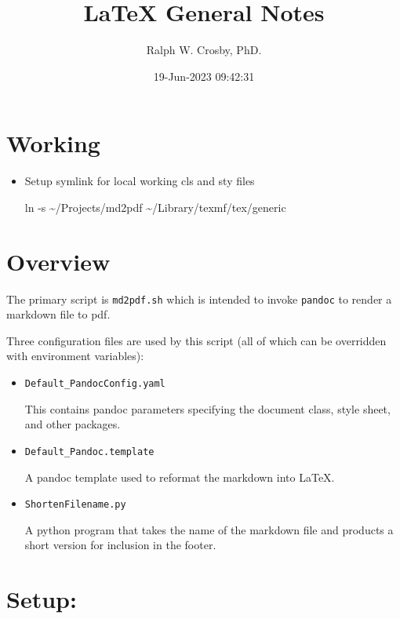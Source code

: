 \documentclass[
]{md2pdf}
\title{LaTeX General Notes}
\author{Ralph W. Crosby, PhD.}
\date{19-Jun-2023 09:42:31}
\newenvironment{Shaded}{}{}
\newcommand{\NormalTok}[1]{#1}
\begin{document}
\maketitle
\thispagestyle{\firstpage}




\hypertarget{working}{%
\section{Working}\label{working}}

\begin{itemize}
\item
  Setup symlink for local working cls and sty files

\begin{Shaded}
\begin{Highlighting}[]
\NormalTok{ln {-}s \textasciitilde{}/Projects/md2pdf \textasciitilde{}/Library/texmf/tex/generic}
\end{Highlighting}
\end{Shaded}
\end{itemize}

\hypertarget{overview}{%
\section{Overview}\label{overview}}

The primary script is \texttt{md2pdf.sh} which is intended to invoke
\texttt{pandoc} to render a markdown file to pdf.

Three configuration files are used by this script (all of which can be
overridden with environment variables):

\begin{itemize}
\item
  \texttt{Default\_PandocConfig.yaml}

  This contains pandoc parameters specifying the document class, style
  sheet, and other packages.
\item
  \texttt{Default\_Pandoc.template}

  A pandoc template used to reformat the markdown into LaTeX.
\item
  \texttt{ShortenFilename.py}

  A python program that takes the name of the markdown file and products
  a short version for inclusion in the footer.
\end{itemize}

\hypertarget{setup}{%
\section{Setup:}\label{setup}}
\end{document}
